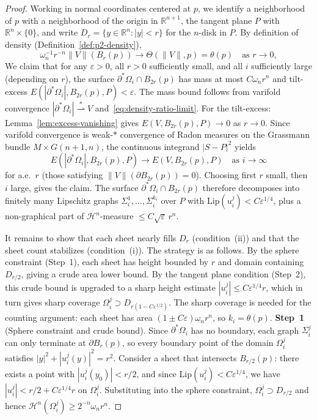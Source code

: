 \begin{proof}
Working in normal coordinates centered at $p$, we identify a neighborhood of $p$ with a neighborhood of the origin in $\mathbb{R}^{n+1}$, the tangent plane $P$ with $\mathbb{R}^n \times \{0\}$, and write $D_r = \{y \in \mathbb{R}^n : |y| < r\}$ for the $n$-disk in $P$. By definition of density (Definition~\ref{def:p2-density}),
\begin{equation}\label{eq:density-ratio-limit}
    \omega_n^{-1} r^{-n} \|V\|(B_r(p)) \to \Theta(\|V\|, p) = \theta(p) \quad \text{as } r \to 0,
\end{equation}
We claim that for any $\varepsilon > 0$, all $r > 0$ sufficiently small, and all $i$ sufficiently large (depending on $r$), the surface $\partial^*\Omega_i \cap B_{2r}(p)$ has mass at most $C\omega_n r^n$ and tilt-excess $E(|\partial^*\Omega_i|, B_{2r}(p), P) < \varepsilon$. The mass bound follows from varifold convergence $|\partial^*\Omega_i| \overset{*}{\rightharpoonup} V$ and~\eqref{eq:density-ratio-limit}. For the tilt-excess: Lemma~\ref{lem:excess-vanishing} gives $E(V, B_{2r}(p), P) \to 0$ as $r \to 0$. Since varifold convergence is weak-$*$ convergence of Radon measures on the Grassmann bundle $M \times G(n+1,n)$, the continuous integrand $|S - P|^2$ yields
\begin{equation}\label{eq:tilt-excess-transfer}
    E(|\partial^*\Omega_i|, B_{2r}(p), P) \to E(V, B_{2r}(p), P) \quad \text{as } i \to \infty
\end{equation}
for a.e.\ $r$ (those satisfying $\|V\|(\partial B_{2r}(p)) = 0$). Choosing first $r$ small, then $i$ large, gives the claim. The surface $\partial^*\Omega_i \cap B_{2r}(p)$ therefore decomposes into finitely many Lipschitz graphs $\Sigma_i^1, \ldots, \Sigma_i^{k_i}$ over $P$ with $\mathrm{Lip}(u_i^j) < C\varepsilon^{1/4}$, plus a non-graphical part of $\mathcal{H}^n$-measure $\leq C\sqrt{\varepsilon}\,r^n$.

It remains to show that each sheet nearly fills $D_r$ (condition~(ii)) and that the sheet count stabilizes (condition~(i)). The strategy is as follows. By the sphere constraint (Step~1), each sheet has height bounded by $r$ and domain containing $D_{r/2}$, giving a crude area lower bound. By the tangent plane condition (Step~2), this crude bound is upgraded to a sharp height estimate $|u_i^j| \leq C\varepsilon^{1/4} r$, which in turn gives sharp coverage $\Omega_i^j \supset D_{r(1-C\varepsilon^{1/2})}$. The sharp coverage is needed for the counting argument: each sheet has area $(1 \pm C\varepsilon)\omega_n r^n$, so $k_i = \theta(p)$.
\medskip\noindent\textbf{Step~1} (Sphere constraint and crude bound). Since $\partial^*\Omega_i$ has no boundary, each graph $\Sigma_i^j$ can only terminate at $\partial B_r(p)$, so every boundary point of the domain $\Omega_i^j$ satisfies $|y|^2 + |u_i^j(y)|^2 = r^2$. Consider a sheet that intersects $B_{r/2}(p)$: there exists a point with $|u_i^j(y_0)| < r/2$, and since $\mathrm{Lip}(u_i^j) < C\varepsilon^{1/4}$, we have $|u_i^j| < r/2 + C\varepsilon^{1/4} r$ on $\Omega_i^j$. Substituting into the sphere constraint, $\Omega_i^j \supset D_{r/2}$ and hence $\mathcal{H}^n(\Omega_i^j) \geq 2^{-n}\omega_n r^n$.


\end{proof}
